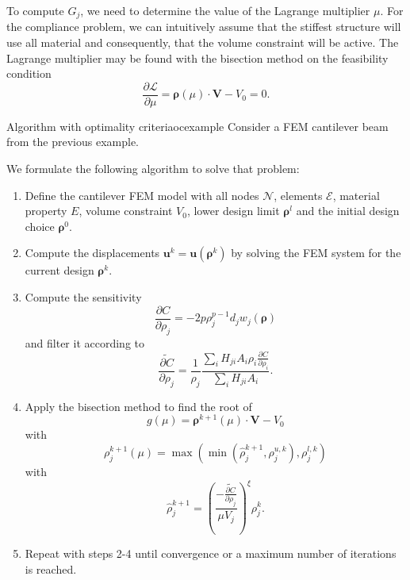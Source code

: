 To compute $G_j$, we need to determine the value of the Lagrange multiplier $\mu$. For the compliance problem, we can intuitively assume that the stiffest structure will use all material and consequently, that the volume constraint will be active. The Lagrange multiplier may be found with the bisection method on the feasibility condition
\begin{equation}
    \frac{\partial \mathcal{L}}{\partial \mu} = \pmb{\rho}(\mu) \cdot \mathbf{V} - V_0 = 0.
\end{equation}

\begin{example}{Algorithm with optimality criteria}{ocexample}
    Consider a FEM cantilever beam from the previous example. 

    We formulate the following algorithm to solve that problem: 
    \begin{enumerate}
        \item Define the cantilever FEM model with all nodes $\mathcal{N}$, elements $\mathcal{E}$, material property $E$, volume constraint $V_0$, lower design limit $\pmb{\rho}^l$ and the initial design choice $\pmb{\rho}^0$.
        \item Compute the displacements $\mathbf{u}^k = \mathbf{u}(\pmb{\rho}^k)$ by solving the FEM system for the current design $\pmb{\rho}^k$.
        \item Compute the sensitivity 
        \begin{equation}
            \frac{\partial C}{\partial \rho_j} = -2 p \rho_j^{p-1} d_j w_j(\pmb{\rho})
        \end{equation}
        and filter it according to
        \begin{equation}
            \widetilde{\frac{\partial C}{\partial \rho_j}} = \frac{1}{\rho_j} \frac{\sum_i H_{ji} A_i \rho_i \frac{\partial C}{\partial \rho_i} }{\sum_i H_{ji} A_i}.
        \end{equation}
        \item Apply the bisection method to find the root of 
            \begin{equation}
                g(\mu) = \pmb{\rho}^{k+1}(\mu) \cdot \mathbf{V} - V_0
            \end{equation}
        with 
        \begin{equation}
            \rho^{k+1}_j(\mu) = \max \left( \min \left( \hat{\rho}_j^{k+1} , \rho_j^{u,k} \right), \rho_j^{l,k} \right)
        \end{equation}
        with
        \begin{equation}
            \hat{\rho}_j^{k+1} = \left(\frac{ - \widetilde{\frac{\partial C}{\partial \rho_j}}}{\mu V_j}\right)^\xi \rho_j^k.
        \end{equation}
        \item Repeat with steps 2-4 until convergence or a maximum number of iterations is reached.
    \end{enumerate}
\end{example}

